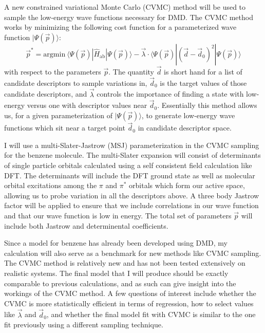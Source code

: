 \documentclass[12pt]{article}
\begin{document}
A new constrained variational Monte Carlo (CVMC) method will be used to sample the low-energy wave functions necessary for DMD.
The CVMC method works by minimizing the following cost function for a parameterized wave function $|\Psi(\vec{p})\rangle$:
\begin{equation}
\vec{p}^* = \text{argmin} \ \langle \Psi(\vec{p}) | \hat{H}_\text{ab} | \Psi(\vec{p}) \rangle - \vec{\lambda} \cdot \langle \Psi(\vec{p}) | (\vec{d} - \vec{d}_0)^2 | \Psi(\vec{p}) \rangle 
\end{equation}
with respect to the parameters $\vec{p}$.
The quantity $\vec{d}$ is short hand for a list of candidate descriptors to sample variations in, $\vec{d}_0$ is the target values of those candidate descriptors, and $\vec{\lambda}$ controls the importance of finding a state with low-energy versus one with descriptor values near $\vec{d}_0$.
Essentially this method allows us, for a given parameterization of $|\Psi(\vec{p})\rangle$, to generate low-energy wave functions which sit near a target point $\vec{d}_0$ in candidate descriptor space.

I will use a multi-Slater-Jastrow (MSJ) parameterization in the CVMC sampling for the benzene molecule.
The multi-Slater expansion will consist of determinants of single particle orbitals calculated using a self consistent field calculation like DFT.
The determinants will include the DFT ground state as well as molecular orbital excitations among the $\pi$ and $\pi^*$ orbitals which form our active space, allowing us to probe variation in all the descriptors above.
A three body Jastrow factor will be applied to ensure that we include correlations in our wave function and that our wave function is low in energy.
The total set of parameters $\vec{p}$ will include both Jastrow and determinental coefficients.

Since a model for benzene has already been developed using DMD, my calculation will also serve as a benchmark for new methods like CVMC sampling.
The CVMC method is relatively new and has not been tested extensively on realistic systems.
The final model that I will produce should be exactly comparable to previous calculations, and as such can give insight into the workings of the CVMC method.
A few questions of interest include whether the CVMC is more statistically efficient in terms of regression, how to select values like $\vec{\lambda}$ and $\vec{d}_0$, and whether the final model fit with CVMC is similar to the one fit previously using a different sampling technique.
\end{document}
